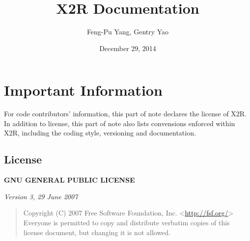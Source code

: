 \documentclass[letterpaper,10pt,english]{sphinxmanual}
\title{X2R Documentation}
\date{December 29, 2014}
\author{Feng-Pu Yang, Gentry Yao}
\begin{document}
\maketitle
\tableofcontents
{}\label{index::doc}



\chapter{Important Information}
\label{index:welcome-to-x2r-document}\label{index:important-information}
For code contributors' information, this part of note declares the license of X2R. In addition to license, this part of note also lists convensions enforced within X2R, including the coding style, versioning and documentation.


\section{License}
\label{docs/license::doc}\label{docs/license:license}\label{docs/license:id1}
\textbf{GNU GENERAL PUBLIC LICENSE}

\emph{Version 3, 29 June 2007}
\begin{quote}

Copyright (C) 2007 Free Software Foundation, Inc. \textless{}\href{http://fsf.org/}{http://fsf.org/}\textgreater{}
Everyone is permitted to copy and distribute verbatim copies
of this license document, but changing it is not allowed.
\end{quote}
\end{document}

